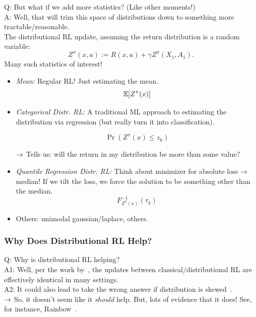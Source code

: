Q: But what if we add more statistics? (Like other moments!) \\

A: Well, that will trim this space of distributions down to something more tractable/reasonable. \\

The distributional RL update, assuming the return distribution is a random variable:
\[
Z^\pi(x,a) := R(x,a) + \gamma Z^\pi(X_1, A_1).
\]
Many such statistics of interest!
\begin{itemize}
    \item {\it Mean:} Regular RL! Just estimating the mean.
    \[
    \mathbb{E}[Z^\pi(x)]
    \]
    \item {\it Categorical Distr. RL:} A traditional ML approach to estimating the distribution via regression (but really turn it into classification).
    
    \[
    \Pr(Z^\pi(x) \leq z_k)
    \]
    
    $\rightarrow$ Tells us: will the return in my distribution be more than some value?
    
    \item {\it Quantile Regression Distr. RL:} Think about minimizer for absolute loss $\rightarrow$ median! If we tilt the loss, we force the solution to be something other than the median.
    \[
    F_{Z^\pi(x)}^{-1}(\tau_k)
    \]
    \item Others: unimodal gaussian/laplace, others.
\end{itemize}

\subsubsection{Why Does Distributional RL Help?}

Q: Why is distributional RL helping? \\

A1: Well, per the work by~\citet{lyle2019comparative}, the updates between classical/distributional RL are effectively identical in many settings. \\

A2: It could also lead to take the wrong answer if distribution is skewed~\cite{rowland2019statistics}. \\

$\rightarrow$ So, it doesn't seem like it {\it should} help. But, lots of evidence that it does! See, for instance, Rainbow~\cite{hessel2018rainbow}.\\

